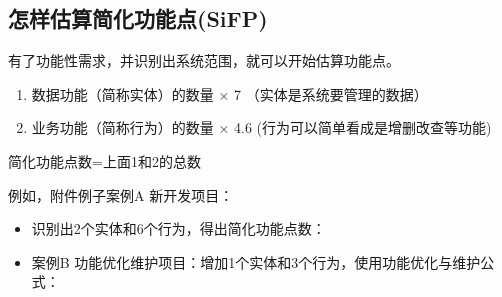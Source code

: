 \hypertarget{ux600eux6837ux4f30ux7b97ux7b80ux5316ux529fux80fdux70b9sifp}{%
\subsection{怎样估算简化功能点(SiFP)}\label{ux600eux6837ux4f30ux7b97ux7b80ux5316ux529fux80fdux70b9sifp}}

有了功能性需求，并识别出系统范围，就可以开始估算功能点。

\begin{enumerate}
\tightlist
\item
  数据功能（简称实体）的数量 × 7 （实体是系统要管理的数据）
\item
  业务功能（简称行为）的数量 × 4.6 (行为可以简单看成是增删改查等功能)
\end{enumerate}

\begin{description}
\tightlist
\item[]
简化功能点数=上面1和2的总数\\
\end{description}

例如，附件例子案例A 新开发项目：

\begin{itemize}
\tightlist
\item
  识别出2个实体和6个行为，得出简化功能点数：
\end{itemize}

\begin{description}
\item[]
\end{description}

\begin{itemize}
\tightlist
\item
  案例B 功能优化维护项目：增加1个实体和3个行为，使用功能优化与维护公式：
\end{itemize}

\begin{description}
\item[]
\end{description}

